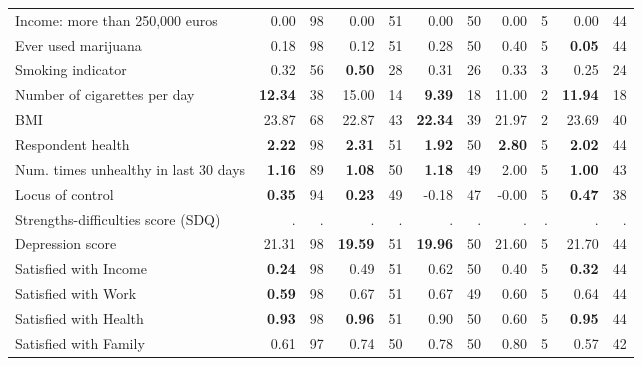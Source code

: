 \begin{tabular}{l r r r r r r r r r r}
Income: more than 250,000 euros &      0.00 &        98 &      0.00 &        51 &      0.00 &        50 &      0.00 &         5 &      0.00 &        44 \\
Ever used marijuana &      0.18 &        98 &      0.12 &        51 &      0.28 &        50 &      0.40 &         5 & \textbf{     0.05} &        44 \\
Smoking indicator &      0.32 &        56 & \textbf{     0.50} &        28 &      0.31 &        26 &      0.33 &         3 &      0.25 &        24 \\
Number of cigarettes per day & \textbf{    12.34} &        38 &     15.00 &        14 & \textbf{     9.39} &        18 &     11.00 &         2 & \textbf{    11.94} &        18 \\
BMI &     23.87 &        68 &     22.87 &        43 & \textbf{    22.34} &        39 &     21.97 &         2 &     23.69 &        40 \\
Respondent health & \textbf{     2.22} &        98 & \textbf{     2.31} &        51 & \textbf{     1.92} &        50 & \textbf{     2.80} &         5 & \textbf{     2.02} &        44 \\
Num. times unhealthy in last 30 days & \textbf{     1.16} &        89 & \textbf{     1.08} &        50 & \textbf{     1.18} &        49 &      2.00 &         5 & \textbf{     1.00} &        43 \\
Locus of control & \textbf{     0.35} &        94 & \textbf{     0.23} &        49 &     -0.18 &        47 &     -0.00 &         5 & \textbf{     0.47} &        38 \\
Strengths-difficulties score (SDQ) &         . & . &         . & . &         . & . &         . & . &         . & . \\
Depression score &     21.31 &        98 & \textbf{    19.59} &        51 & \textbf{    19.96} &        50 &     21.60 &         5 &     21.70 &        44 \\
Satisfied with Income & \textbf{     0.24} &        98 &      0.49 &        51 &      0.62 &        50 &      0.40 &         5 & \textbf{     0.32} &        44 \\
Satisfied with Work & \textbf{     0.59} &        98 &      0.67 &        51 &      0.67 &        49 &      0.60 &         5 &      0.64 &        44 \\
Satisfied with Health & \textbf{     0.93} &        98 & \textbf{     0.96} &        51 &      0.90 &        50 &      0.60 &         5 & \textbf{     0.95} &        44 \\
Satisfied with Family &      0.61 &        97 &      0.74 &        50 &      0.78 &        50 &      0.80 &         5 &      0.57 &        42 \\
\bottomrule
\end{tabular}
